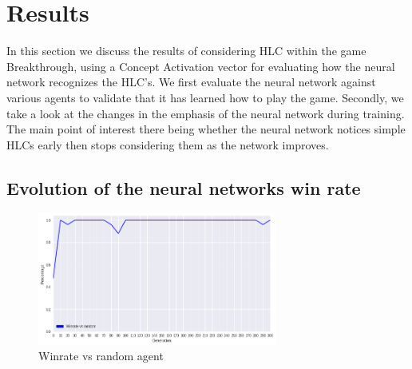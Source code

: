 \chapter{Results}

\label{cha:results}


In this section we discuss the results of considering HLC within the game Breakthrough, using a Concept Activation vector for evaluating how the neural network recognizes the HLC's. We first evaluate the neural network against various agents to validate that it has learned how to play the game. Secondly, we take a look at the changes in the emphasis of the neural network during training. The main point of interest there being whether the neural network notices simple HLCs early then stops considering them as the network improves.

\section{Evolution of the neural networks win rate}

\begin{figure}
    \begin{small}
        \begin{center}
            \includegraphics[width=0.7\textwidth]{graphics/winratevsrandom.png}
        \end{center}
        \caption{Winrate vs random agent}
        \label{fig:winratevsrandom}
    \end{small}
\end{figure}

